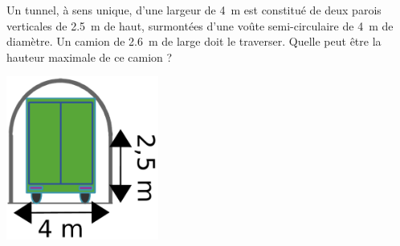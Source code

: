 
\begin{exercice}\label{exo2smath-0264}


    Un tunnel, à sens unique, d'une largeur de \SI{4}{\meter} est constitué de deux parois verticales de \SI{2.5}{\meter} de haut, surmontées d'une voûte semi-circulaire de \SI{4}{\meter} de diamètre. Un camion de \SI{2.6}{\meter} de large doit le traverser. Quelle peut être la hauteur maximale de ce camion ?

\includegraphics[width=5cm]{camiontunel.pdf}

\end{exercice}
